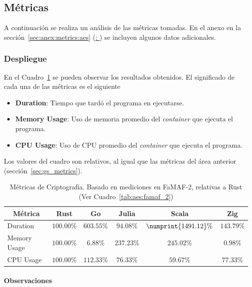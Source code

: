 \documentclass[11pt]{article}
\let\Oldsubsection\subsection
\renewcommand{\subsection}{\FloatBarrier\Oldsubsection}
\let\Oldsubsubsection\subsubsection
\renewcommand{\subsubsection}{\FloatBarrier\Oldsubsubsection}
\newcommand{\english}[1]{\textit{#1}}
\begin{document}
\newpage

\subsection{Métricas}

A continuación se realiza un análisis de las métricas tomadas. En el anexo en la sección~\ref{sec:anex:metrics:aes} (\hyperref[sec:anex:metrics:aes]{: }) se incluyen algunos datos adicionales.

\subsubsection{Despliegue}

En el Cuadro~\ref{tab:aes:metrics} se pueden observar los resultados obtenidos. El significado de cada una de las métricas es el siguiente

\begin{itemize}
    \item \textbf{Duration}: Tiempo que tardó el programa en ejecutarse.
    \item \textbf{Memory Usage}: Uso de memoria promedio del \english{container} que ejecuta el programa.
    \item \textbf{CPU Usage}: Uso de CPU promedio del \english{container} que ejecuta el programa.
\end{itemize}

Los valores del cuadro son relativos, al igual que las métricas del área anterior (sección~\ref{sec:gs_metrics}).

\begin{table}[h]
\centering
\begin{tabular}{|l|c|c|c|c|c|}
\hline
\multicolumn{1}{|c|}{Métrica} & Rust & Go & Julia & Scala & Zig \\ \hline
Duration & $100.00\%$& $603.55\%$& $94.08\%$& $\numprint{1491.12}\%$& $143.79\%$\\ \hline
Memory Usage & $100.00\%$& $6.88\%$& $237.23\%$& $245.02\%$& $0.98\%$\\ \hline
CPU Usage & $100.00\%$& $112.33\%$& $76.33\%$& $59.67\%$& $77.33\%$\\ \hline
\end{tabular}
\caption{Métricas de Criptografía. Basado en mediciones en FaMAF-2, relativas a Rust  (Ver Cuadro~\ref{tab:aes:famaf_2})}
\label{tab:aes:metrics}
\end{table}

\paragraph{Observaciones}
\end{document}
